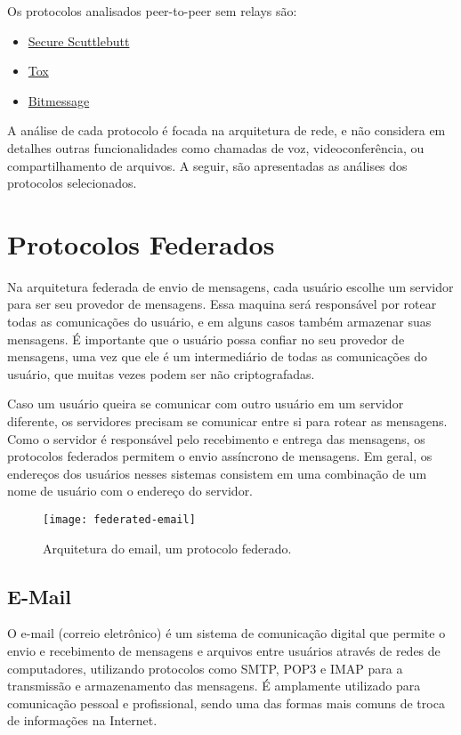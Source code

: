 Os protocolos analisados peer-to-peer sem relays são:
\begin{itemize}
  \item \href{https://scuttlebutt.nz/}{Secure Scuttlebutt}
  \item \href{https://tox.chat/}{Tox}
  \item \href{https://bitmessage.org/}{Bitmessage}
\end{itemize}

A análise de cada protocolo é focada na arquitetura de rede, e não considera em detalhes outras funcionalidades como chamadas de voz, videoconferência, ou compartilhamento de arquivos. A seguir, são apresentadas as análises dos protocolos selecionados.

\section{Protocolos Federados}

Na arquitetura federada de envio de mensagens, cada usuário escolhe um servidor para ser seu provedor de mensagens. Essa maquina será responsável por rotear todas as comunicações do usuário, e em alguns casos também armazenar suas mensagens. É importante que o usuário possa confiar no seu provedor de mensagens, uma vez que ele é um intermediário de todas as comunicações do usuário, que muitas vezes podem ser não criptografadas.

Caso um usuário queira se comunicar com outro usuário em um servidor diferente, os servidores precisam se comunicar entre si para rotear as mensagens. Como o servidor é responsável pelo recebimento e entrega das mensagens, os protocolos federados permitem o envio assíncrono de mensagens. Em geral, os endereços dos usuários nesses sistemas consistem em uma combinação de um nome de usuário com o endereço do servidor.

\begin{figure}
  \centering
  \texttt{[image: federated-email]}

  \caption{Arquitetura do email, um protocolo federado. \cite{email-picture}}
\end{figure}

\subsection{E-Mail}

O e-mail (correio eletrônico) é um sistema de comunicação digital que permite o envio e recebimento de mensagens e arquivos entre usuários através de redes de computadores, utilizando protocolos como SMTP, POP3 e IMAP para a transmissão e armazenamento das mensagens. É amplamente utilizado para comunicação pessoal e profissional, sendo uma das formas mais comuns de troca de informações na Internet. \cite{rfc5321}

